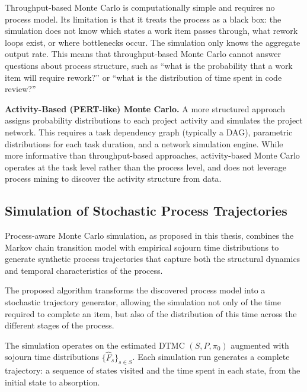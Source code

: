 Throughput-based Monte Carlo is computationally simple and requires no
process model. Its limitation is that it treats the process as a black
box: the simulation does not know which states a work item passes through,
what rework loops exist, or where bottlenecks occur. The simulation only
knows the aggregate output rate. This means that throughput-based Monte
Carlo cannot answer questions about process structure, such as ``what is
the probability that a work item will require rework?'' or ``what is the
distribution of time spent in code review?''

\textbf{Activity-Based (PERT-like) Monte Carlo.} A more structured
approach assigns probability distributions to each project activity and
simulates the project network. This requires a task dependency graph
(typically a DAG), parametric distributions for each task duration, and
a network simulation engine. While more informative than throughput-based
approaches, activity-based Monte Carlo operates at the task level rather
than the process level, and does not leverage process mining to discover
the activity structure from data.


\subsection{Simulation of Stochastic Process Trajectories}
\label{sec:mc-trajectories}

Process-aware Monte Carlo simulation, as proposed in this thesis,
combines the Markov chain transition model with empirical sojourn time
distributions to generate synthetic process trajectories that capture
both the structural dynamics and temporal characteristics of the
process.

The proposed algorithm transforms the discovered process model into a stochastic trajectory generator, allowing the simulation not only of the time required to complete an item, but also of the distribution of this time across the different stages of the process.

The simulation operates on the estimated DTMC $(S, P, \pi_0)$ augmented
with sojourn time distributions $\{\hat{F}_s\}_{s \in S}$. Each
simulation run generates a complete trajectory: a sequence of states
visited and the time spent in each state, from the initial state to
absorption.

